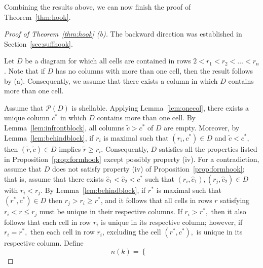 \documentclass[letterpaper,10pt]{article}
\newcommand{\rn}[1]{{\color{red} #1}}
\begin{document}
Combining the results above, we can now finish the proof of Theorem~\ref{thm:hook}.

\begin{proof}[Proof of Theorem~\ref{thm:hook} \textup(b\textup)] The backward direction was established in Section~\ref{sec:suffhook}.

Let $D$ be a diagram for which all cells are contained in rows $2<r_1<r_2<\hdots<r_n$. Note that if $D$ has no columns with more than one cell, then the result follows by (a). Consequently, we assume that there exists a column in which $D$ contains more than one cell. 

Assume that $\mathcal{P}(D)$ is shellable. Applying Lemma~\ref{lem:onecol}, there exists a unique column $c^*$ in which $D$ contains more than one cell. By Lemma~\ref{lem:infrontblock}, all columns $\tilde{c}>c^*$ of $D$ are empty. Moreover, by Lemma~\ref{lem:behindblock}, if $r_i$ is maximal such that $(r_i,c^*)\in D$ and $\tilde{c}<c^*$, then $(\tilde{r},\tilde{c})\in D$ implies $\tilde{r}\ge r_i$. Consequently, $D$ satisfies all the properties listed in Proposition~\ref{prop:formhook} except possibly property (iv). For a contradiction, assume that $D$ does not satisfy property (iv) of Proposition~\ref{prop:formhook}; that is, assume that there exists $\widehat{c}_1<\widehat{c}_2<c^*$ such that 
$(r_i,\widehat{c}_1),(r_j,\widehat{c}_2)\in D$ with $r_i<r_j.$
By Lemma~\ref{lem:behindblock}, if $r^*$ is maximal such that $(r^*,c^*)\in D$ then $r_j>r_i\ge r^*$, and it follows that all cells in rows $r$ satisfying $r_i<r\le r_j$ must be unique in their respective columns. If $r_i>r^*,$ then it also follows that each cell in row $r_i$ is unique in its respective column; however, if $r_i=r^*,$ then each cell in row $r_i$, excluding the cell $(r^*,c^*),$ is unique in its respective column. Define $$n(k)=\begin{cases}

\end{cases}$$
\end{proof}
\end{document}

